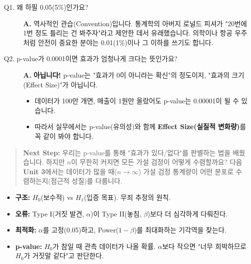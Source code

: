 \documentclass[11pt,a4paper]{book}
\theoremstyle{definition}
\begin{document}
\begin{description}
    \item[Q1. 왜 하필 0.05(5\%)인가요?]
    \textbf{A.} 역사적인 관습(Convention)입니다. 통계학의 아버지 로널드 피셔가 "20번에 1번 정도 틀리는 건 봐주자"라고 제안한 데서 유래했습니다. 의학이나 항공 우주처럼 안전이 중요한 분야는 0.01(1\%)이나 그 이하를 쓰기도 합니다.
    
    \item[Q2. p-value가 0.0001이면 효과가 엄청나게 크다는 뜻인가요?]
    \textbf{A.} \textbf{아닙니다!} p-value는 "효과가 0이 아니라는 확신"의 정도이지, "효과의 크기(Effect Size)"가 아닙니다.
    \begin{itemize}
        \item 데이터가 100만 개면, 매출이 1원만 올랐어도 p-value는 0.00001이 될 수 있습니다.
        \item 따라서 실무에서는 p-value(유의성)와 함께 \textbf{Effect Size(실질적 변화량)}를 꼭 같이 봐야 합니다.
    \end{itemize}
\end{description}

\vspace{1cm}
\begin{quote}
\textbf{Next Step:} 우리는 p-value를 통해 "효과가 있다/없다"를 판별하는 법을 배웠습니다. 하지만 $n$이 무한히 커지면 모든 가설 검정이 어떻게 수렴할까요? 다음 \textbf{Unit 3}에서는 데이터가 많을 때($n \to \infty$) 가설 검정 통계량이 어떤 분포로 수렴하는지(점근적 성질)를 다룹니다.
\end{quote}

\begin{summarybox}[title={Unit 2 (Part B) 핵심 요약}]
\begin{itemize}
    \item \textbf{구조:} $H_0$(보수적) vs $H_1$(입증 목표). 무죄 추정의 원칙.
    \item \textbf{오류:} Type I(거짓 발견, $\alpha$)이 Type II(놓침, $\beta$)보다 더 심각하게 다뤄진다.
    \item \textbf{최적화:} $\alpha$를 고정(0.05)하고, Power($1-\beta$)를 최대화하는 기각역을 찾는다.
    \item \textbf{p-value:} $H_0$가 참일 때 관측 데이터가 나올 확률. $\alpha$보다 작으면 "너무 희박하므로 $H_0$가 거짓말 같다"고 판단한다.
\end{itemize}
\end{summarybox}


\end{document}
